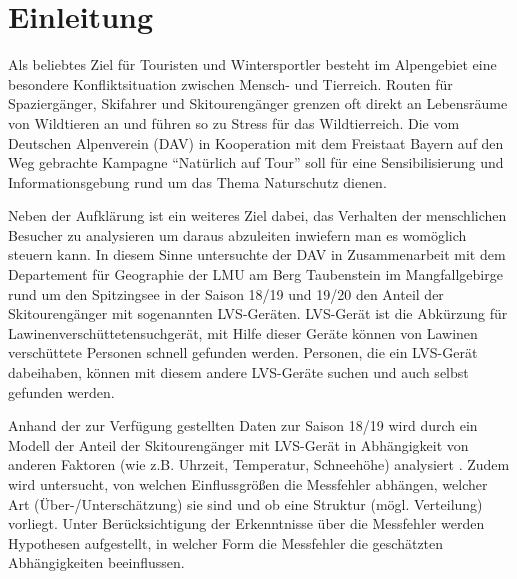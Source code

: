 \documentclass[12pt]{scrreprt}
\begin{document}
	
	
	
	\vspace{5cm}
	
	
	
	
	
	
	
	\thispagestyle{empty}
	
	
	
	
	
	
	\begingroup
	\tableofcontents
	\newpage
	\listoffigures
	\listoftables
	\setcounter{page}{1}
	\thispagestyle{empty}
	
	\endgroup
	
	\newpage
	
	\chapter{Einleitung}
	\setcounter{page}{1}
	Als beliebtes Ziel für Touristen und Wintersportler besteht im Alpengebiet eine besondere Konfliktsituation zwischen Mensch- und Tierreich. Routen für Spaziergänger, Skifahrer und Skitourengänger grenzen oft direkt an Lebensräume von Wildtieren an und führen so zu Stress für das Wildtierreich. Die vom Deutschen Alpenverein (DAV) in Kooperation mit dem Freistaat Bayern auf den Weg gebrachte Kampagne "`Natürlich auf Tour"' soll für eine Sensibilisierung und Informationsgebung rund um das Thema Naturschutz dienen.
	
	Neben der Aufklärung ist ein weiteres Ziel dabei, das Verhalten der menschlichen Besucher zu analysieren um daraus abzuleiten inwiefern man es womöglich steuern kann. In diesem Sinne untersuchte der DAV in Zusammenarbeit mit dem Departement für Geographie der LMU am Berg Taubenstein im Mangfallgebirge rund um den Spitzingsee in der Saison 18/19 und 19/20 den Anteil der Skitourengänger mit sogenannten LVS-Geräten. LVS-Gerät ist die Abkürzung für Lawinenverschüttetensuchgerät, mit Hilfe dieser Geräte können von Lawinen verschüttete Personen schnell gefunden werden. Personen, die ein LVS-Gerät dabeihaben, können mit diesem andere LVS-Geräte suchen und auch selbst gefunden werden.
	
	Anhand der zur Verfügung gestellten Daten zur Saison 18/19 wird durch ein Modell der Anteil der Skitourengänger mit LVS-Gerät in Abhängigkeit von anderen Faktoren (wie z.B. Uhrzeit, Temperatur, Schneehöhe) analysiert .
	Zudem wird untersucht, von welchen Einflussgrößen die Messfehler abhängen, welcher Art (Über-/Unterschätzung) sie sind und ob eine Struktur (mögl. Verteilung) vorliegt.
	Unter Berücksichtigung der Erkenntnisse über die Messfehler werden Hypothesen aufgestellt, in welcher Form die Messfehler die geschätzten Abhängigkeiten beeinflussen.
	
\end{document}
